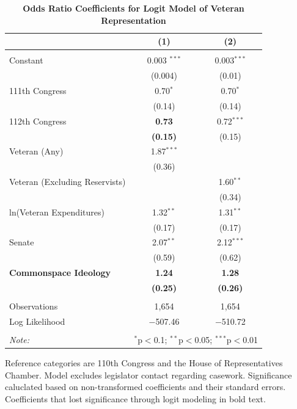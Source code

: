 \documentclass[12pt,letterpaper]{article}
\begin{document}
	
\newpage
	\begin{table}[!htbp] \centering 
		\caption{\textbf{Odds Ratio Coefficients for Logit Model of Veteran Representation}}
		\label{} 
		\begin{threeparttable}
		\begin{tabular}{@{\extracolsep{5pt}}lcc} 
			\hline 
			\hline
			 & (1) & (2)\\ 
			\hline \\[-1.8ex] 
			Constant & 0.003 $^{***}$ & 0.003$^{***}$ \\ 
			& (0.004) & (0.01) \\ 
			111th Congress & 0.70$^{*}$ & 0.70$^{*}$ \\ 
			& (0.14) & (0.14) \\ 
			112th Congress & \textbf{0.73} & 0.72$^{***}$ \\ 
			& \textbf{(0.15)} & (0.15) \\ 
			Veteran (Any) & 1.87$^{***}$ &  \\ 
			& (0.36) &  \\ 
			Veteran (Excluding Reservists) &  & 1.60$^{**}$ \\ 
			&  & (0.34) \\ 
			ln(Veteran Expenditures) & 1.32$^{**}$ & 1.31$^{**}$ \\ 
			& (0.17) & (0.17) \\ 
			Senate & 2.07$^{**}$ & 2.12$^{***}$ \\ 
			& (0.59) & (0.62) \\ 
			\textbf{Commonspace Ideology} & \textbf{1.24} & \textbf{1.28} \\ 
			& \textbf{(0.25)} & \textbf{(0.26)} \\ 
			\hline \\[-1.8ex] 
			Observations & 1,654 & 1,654 \\ 
			Log Likelihood & $-$507.46 & $-$510.72 \\ 
			\hline 
			\hline \\[-1.8ex] 
			\textit{Note:}  & \multicolumn{2}{r}{$^{*}$p$<$0.1; $^{**}$p$<$0.05; $^{***}$p$<$0.01} \\ 
			\end{tabular} 
			\begin{tablenotes}[flushleft]\small
			\item Reference categories are 110th Congress and the House of Representatives Chamber. Model excludes legislator contact regarding casework. Significance caluclated based on non-transformed coefficients and their standard errors. Coefficients that lost significance through logit modeling in bold text.
			\end{tablenotes}
			\end{threeparttable}
	\end{table} 
	
\end{document}
